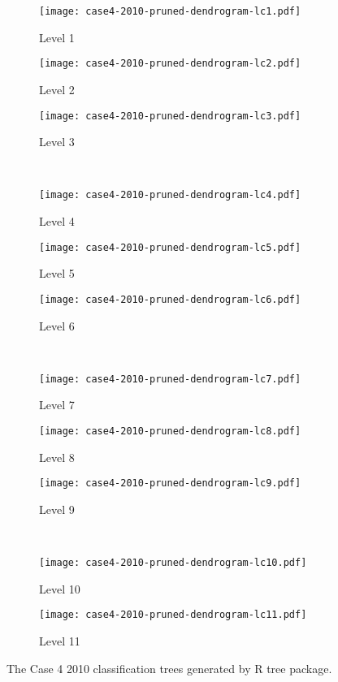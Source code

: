 \begin{appendices}

\begin{figure}[!ht] \centering
	\captionsetup[subfigure]{width=2.0in}
	\begin{subfigure}[t]{0.32\textwidth}
		\texttt{[image: case4-2010-pruned-dendrogram-lc1.pdf]}
		\caption{Level 1}
	\end{subfigure}
	\begin{subfigure}[t]{0.32\textwidth}
		\texttt{[image: case4-2010-pruned-dendrogram-lc2.pdf]}
		\caption{Level 2}
	\end{subfigure}
	\begin{subfigure}[t]{0.32\textwidth}
		\texttt{[image: case4-2010-pruned-dendrogram-lc3.pdf]}
		\caption{Level 3}
	\end{subfigure}\\
	\vspace{5pt}
	\begin{subfigure}[t]{0.32\textwidth}
		\texttt{[image: case4-2010-pruned-dendrogram-lc4.pdf]}
		\caption{Level 4}
	\end{subfigure}
	\begin{subfigure}[t]{0.32\textwidth}
		\texttt{[image: case4-2010-pruned-dendrogram-lc5.pdf]}
		\caption{Level 5}
	\end{subfigure}
	\begin{subfigure}[t]{0.32\textwidth}
		\texttt{[image: case4-2010-pruned-dendrogram-lc6.pdf]}
		\caption{Level 6}
	\end{subfigure}\\
	\vspace{5pt}	
	\begin{subfigure}[t]{0.32\textwidth}
		\texttt{[image: case4-2010-pruned-dendrogram-lc7.pdf]}
		\caption{Level 7}
	\end{subfigure}
	\begin{subfigure}[t]{0.32\textwidth}
		\texttt{[image: case4-2010-pruned-dendrogram-lc8.pdf]}
		\caption{Level 8}
	\end{subfigure}
	\begin{subfigure}[t]{0.32\textwidth}
		\texttt{[image: case4-2010-pruned-dendrogram-lc9.pdf]}
		\caption{Level 9}
	\end{subfigure}\\
	\vspace{5pt}
	\begin{subfigure}[t]{0.32\textwidth}
		\texttt{[image: case4-2010-pruned-dendrogram-lc10.pdf]}
		\caption{Level 10}
	\end{subfigure}
	\begin{subfigure}[t]{0.32\textwidth}
		\texttt{[image: case4-2010-pruned-dendrogram-lc11.pdf]}
		\caption{Level 11}
	\end{subfigure}
	\vspace{5pt}
	\caption[The Case 4 2010 classification trees generated by R tree package.]{The Case 4 2010 classification trees generated by R tree package.}
	\label{fig: appendix-fig.c31.tree}
\end{figure}


\end{appendices}
